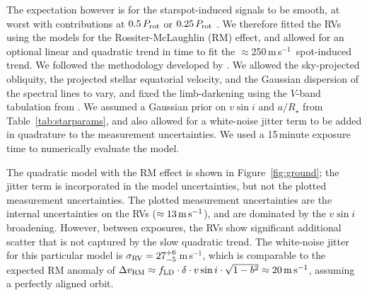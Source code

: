 \documentclass[12pt,modern,twocolumn,tighten,linenumbers,trackchanges]{aastex63}
\newcommand{\ms}{\,m\,s$^{-1}$}
\begin{document}
The expectation however is for the starspot-induced signals to be
smooth, at worst with contributions at $0.5\,P_{\rm rot}$ or
$0.25\,P_{\rm rot}$ \citep{klein_simulated_2020}.  We therefore fitted
the RVs using the \citet{hirano_analytic_2010,hirano_2011} models for
the Rossiter-McLaughlin (RM) effect, and allowed for an optional
linear and quadratic trend in time to fit the $\approx$250\ms\
spot-induced trend.  We followed the methodology developed by
\citet{stefansson_2020}.  We allowed the sky-projected obliquity, the
projected stellar equatorial velocity, and the Gaussian dispersion of
the spectral lines to vary, and fixed the limb-darkening using the
$V$-band tabulation from \citet{claret_gravity_2011}.  We assumed a
Gaussian prior on $v\sin i$ and $a/R_\star$ from
Table~\ref{tab:starparams}, and also allowed for a white-noise jitter
term to be added in quadrature to the measurement uncertainties.  We
used a 15\,minute exposure time to numerically evaluate the model.

The quadratic model with the RM effect is shown in
Figure~\ref{fig:ground}; the jitter term is incorporated in the model
uncertainties, but not the plotted measurement uncertainties.  The
plotted measurement uncertainties are the internal uncertainties on
the RVs ($\approx 13\,{\rm m\,s}^{-1}$), and are dominated by the
$v\sin i$ broadening.  However, between exposures, the RVs show
significant additional scatter that is not captured by the slow
quadratic trend.  The white-noise jitter for this particular model is
$\sigma_{\rm RV} = 27^{+6}_{-5}$\ms, which is comparable to the
expected RM anomaly of $\Delta v_{\rm RM} \approx f_{\rm LD} \cdot
\delta \cdot v\sin i \cdot \sqrt{1-b^2} \approx 20\,{\rm m\,s}^{-1}$,
assuming a perfectly aligned orbit.
\end{document}
